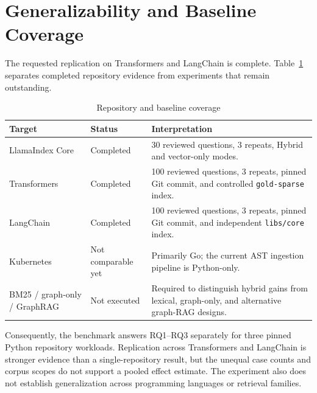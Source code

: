\documentclass[12pt,letterpaper,oneside]{report}
\begin{document}
\section{Generalizability and Baseline Coverage}
The requested replication on Transformers and LangChain is complete. Table~\ref{tab:evaluation_coverage} separates completed repository evidence from experiments that remain outstanding.

\begin{table}[H]
    \centering
    \caption{Repository and baseline coverage}
    \label{tab:evaluation_coverage}
    \begin{tabular}{p{3.2cm}p{3.2cm}p{6.4cm}}
        \toprule
        \textbf{Target} & \textbf{Status} & \textbf{Interpretation} \\
        \midrule
        LlamaIndex Core & Completed & 30 reviewed questions, 3 repeats, Hybrid and vector-only modes. \\
        Transformers & Completed & 100 reviewed questions, 3 repeats, pinned Git commit, and controlled \texttt{gold-sparse} index. \\
        LangChain & Completed & 100 reviewed questions, 3 repeats, pinned Git commit, and independent \texttt{libs/core} index. \\
        Kubernetes & Not comparable yet & Primarily Go; the current AST ingestion pipeline is Python-only. \\
        BM25 / graph-only / GraphRAG & Not executed & Required to distinguish hybrid gains from lexical, graph-only, and alternative graph-RAG designs. \\
        \bottomrule
    \end{tabular}
\end{table}

Consequently, the benchmark answers RQ1--RQ3 separately for three pinned Python repository workloads. Replication across Transformers and LangChain is stronger evidence than a single-repository result, but the unequal case counts and corpus scopes do not support a pooled effect estimate. The experiment also does not establish generalization across programming languages or retrieval families.
\end{document}
